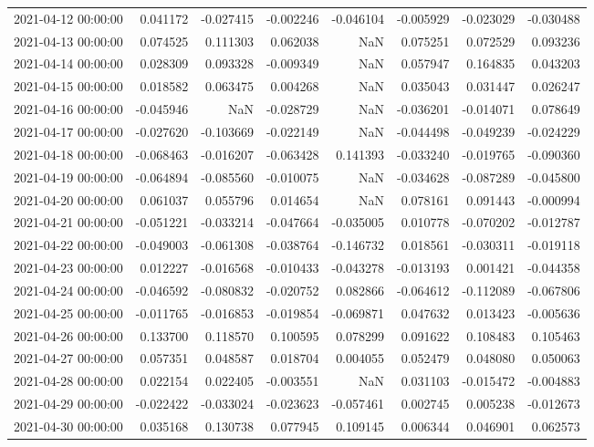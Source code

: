 \begin{tabular}{lrrrrrrr}
2021-04-12 00:00:00 & 0.041172 & -0.027415 & -0.002246 & -0.046104 & -0.005929 & -0.023029 & -0.030488 \\
2021-04-13 00:00:00 & 0.074525 & 0.111303 & 0.062038 & NaN & 0.075251 & 0.072529 & 0.093236 \\
2021-04-14 00:00:00 & 0.028309 & 0.093328 & -0.009349 & NaN & 0.057947 & 0.164835 & 0.043203 \\
2021-04-15 00:00:00 & 0.018582 & 0.063475 & 0.004268 & NaN & 0.035043 & 0.031447 & 0.026247 \\
2021-04-16 00:00:00 & -0.045946 & NaN & -0.028729 & NaN & -0.036201 & -0.014071 & 0.078649 \\
2021-04-17 00:00:00 & -0.027620 & -0.103669 & -0.022149 & NaN & -0.044498 & -0.049239 & -0.024229 \\
2021-04-18 00:00:00 & -0.068463 & -0.016207 & -0.063428 & 0.141393 & -0.033240 & -0.019765 & -0.090360 \\
2021-04-19 00:00:00 & -0.064894 & -0.085560 & -0.010075 & NaN & -0.034628 & -0.087289 & -0.045800 \\
2021-04-20 00:00:00 & 0.061037 & 0.055796 & 0.014654 & NaN & 0.078161 & 0.091443 & -0.000994 \\
2021-04-21 00:00:00 & -0.051221 & -0.033214 & -0.047664 & -0.035005 & 0.010778 & -0.070202 & -0.012787 \\
2021-04-22 00:00:00 & -0.049003 & -0.061308 & -0.038764 & -0.146732 & 0.018561 & -0.030311 & -0.019118 \\
2021-04-23 00:00:00 & 0.012227 & -0.016568 & -0.010433 & -0.043278 & -0.013193 & 0.001421 & -0.044358 \\
2021-04-24 00:00:00 & -0.046592 & -0.080832 & -0.020752 & 0.082866 & -0.064612 & -0.112089 & -0.067806 \\
2021-04-25 00:00:00 & -0.011765 & -0.016853 & -0.019854 & -0.069871 & 0.047632 & 0.013423 & -0.005636 \\
2021-04-26 00:00:00 & 0.133700 & 0.118570 & 0.100595 & 0.078299 & 0.091622 & 0.108483 & 0.105463 \\
2021-04-27 00:00:00 & 0.057351 & 0.048587 & 0.018704 & 0.004055 & 0.052479 & 0.048080 & 0.050063 \\
2021-04-28 00:00:00 & 0.022154 & 0.022405 & -0.003551 & NaN & 0.031103 & -0.015472 & -0.004883 \\
2021-04-29 00:00:00 & -0.022422 & -0.033024 & -0.023623 & -0.057461 & 0.002745 & 0.005238 & -0.012673 \\
2021-04-30 00:00:00 & 0.035168 & 0.130738 & 0.077945 & 0.109145 & 0.006344 & 0.046901 & 0.062573 \\

\end{tabular}
